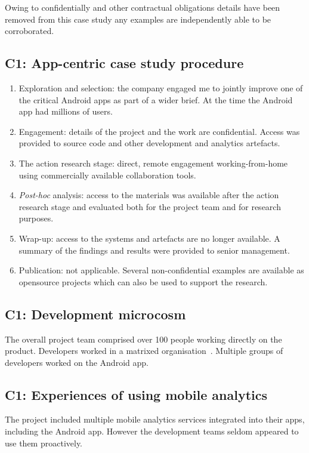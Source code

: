 Owing to confidentially and other contractual obligations details have been removed from this case study any examples are independently able to be corroborated. 


\subsection{C1: App-centric case study procedure}
{\small
\begin{enumerate}
    \itemsep0em
    \item Exploration and selection: the company engaged me to jointly improve one of the critical Android apps as part of a wider brief. At the time the Android app had millions of users.
    \item Engagement: details of the project and the work are confidential. Access was provided to source code and other development and analytics artefacts.
    \item The action research stage: direct, remote engagement working-from-home using commercially available collaboration tools.
    \item \textit{Post-hoc} analysis: access to the materials was available after the action research stage and evaluated both for the project team and for research purposes.
    \item Wrap-up: access to the systems and artefacts are no longer available. A summary of the findings and results were provided to senior management.
    \item Publication: not applicable. Several non-confidential examples are available as opensource projects which can also be used to support the research.
\end{enumerate}
}


\subsection{C1: Development microcosm}
The overall project team comprised over 100 people working directly on the product. Developers worked in a matrixed organisation~\citep[describes matrix organisations in detail]{stuckenbruck1979_the_matrix_organization}. Multiple groups of developers worked on the Android app. 

\subsection{C1: Experiences of using mobile analytics}
The project included multiple mobile analytics services integrated into their apps, including the Android app. However the development teams seldom appeared to use them proactively. 


